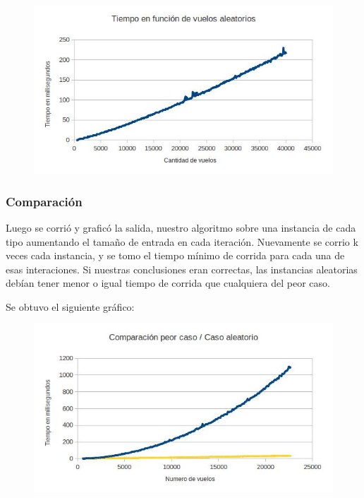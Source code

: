 \begin{figure}[ht]
	\begin{minipage}[t]{\linewidth}
		\centering
		\includegraphics[width=\textwidth]{TiempoEnFuncionDeVuelosAleatorios.jpg}
	\end{minipage}	
\end{figure}

\subsubsection{Comparaci\'on}

Luego se corri\'o y grafic\'o la salida, nuestro algoritmo sobre una instancia de cada tipo aumentando el tamaño de entrada en cada iteraci\'on. Nuevamente se corrio k veces cada instancia, y se tomo el tiempo m\'inimo de corrida para cada una de esas interaciones. Si nuestras conclusiones eran correctas, las instancias aleatorias deb\'ian tener menor o igual tiempo de corrida que cualquiera del peor caso.

Se obtuvo el siguiente gr\'afico:

\begin{figure}[ht]
	\begin{minipage}[t]{\linewidth}
		\centering
		\includegraphics[width=\textwidth]{comparacionVuelosPeorAleatorio.jpg}
	\end{minipage}	
\end{figure}


